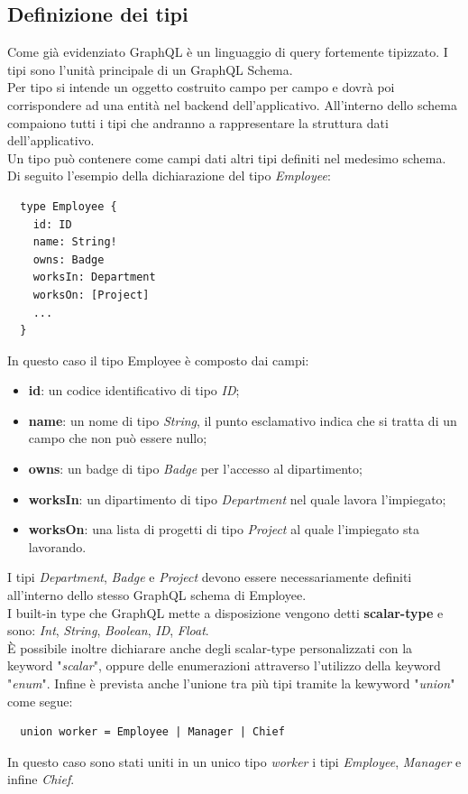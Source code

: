 \subsection*{Definizione dei tipi}
Come già evidenziato GraphQL è un linguaggio di query fortemente tipizzato. I tipi sono l'unità principale di un GraphQL Schema.\\
Per tipo si intende un oggetto costruito campo per campo e dovrà poi corrispondere ad una entità nel backend dell'applicativo. All'interno dello schema compaiono tutti i tipi che andranno a rappresentare la struttura dati dell'applicativo.\\
Un tipo può contenere come campi dati altri tipi definiti nel medesimo schema. Di seguito l'esempio della dichiarazione del tipo \textit{Employee}:
\begin{verbatim}
  type Employee {
    id: ID
    name: String!
    owns: Badge
    worksIn: Department
    worksOn: [Project]
    ...
  }
\end{verbatim}
In questo caso il tipo Employee è composto dai campi:
\begin{itemize}
  \item \textbf{id}: un codice identificativo di tipo \textit{ID};
  \item \textbf{name}: un nome di tipo \textit{String}, il punto esclamativo indica che si tratta di un campo che non può essere nullo;
  \item \textbf{owns}: un badge di tipo \textit{Badge} per l'accesso al dipartimento;
  \item \textbf{worksIn}: un dipartimento di tipo \textit{Department} nel quale lavora l'impiegato;
  \item \textbf{worksOn}: una lista di progetti di tipo \textit{Project} al quale l'impiegato sta lavorando.
\end{itemize}
I tipi \textit{Department}, \textit{Badge} e \textit{Project} devono essere necessariamente definiti all'interno dello stesso GraphQL schema di Employee.\\
I built-in type che GraphQL mette a disposizione vengono detti \textbf{scalar-type} e sono: \textit{Int}, \textit{String}, \textit{Boolean}, \textit{ID}, \textit{Float}.\\
È possibile inoltre dichiarare anche degli scalar-type personalizzati con la keyword "\textit{scalar}", oppure delle enumerazioni attraverso l'utilizzo della keyword "\textit{enum}". Infine è prevista anche l'unione tra più tipi tramite la kewyword "\textit{union}" come segue:
\begin{verbatim}
  union worker = Employee | Manager | Chief
\end{verbatim}
In questo caso sono stati uniti in un unico tipo \textit{worker} i tipi \textit{Employee}, \textit{Manager} e infine \textit{Chief}.
